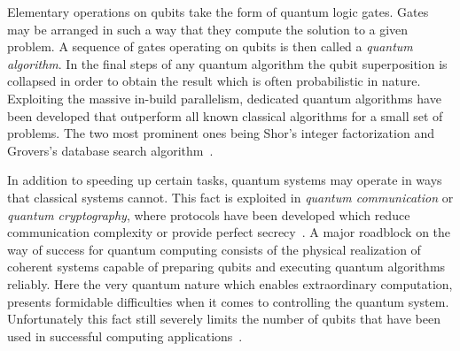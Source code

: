 		Elementary operations on qubits take the form of quantum logic gates. Gates may be arranged in such a way that they compute the solution to a given problem. A sequence of gates operating on qubits is then called a \emph{quantum algorithm}. In the final steps of any quantum algorithm the qubit superposition is collapsed in order to obtain the result which is often probabilistic in nature. Exploiting the massive in-build parallelism, dedicated quantum algorithms have been developed that outperform all known classical algorithms for a small set of problems. The two most prominent ones being Shor's integer factorization and Grovers's database search algorithm~\cite{shor1999polynomial,grover1996fast}. 

		In addition to speeding up certain tasks, quantum systems may operate in ways that classical systems cannot. This fact is exploited in \emph{quantum communication} or \emph{quantum cryptography}, where protocols have been developed which reduce communication complexity or provide perfect secrecy~\cite{de2007fundamentals}. A major roadblock on the way of success for quantum computing consists of the physical realization of coherent systems capable of preparing qubits and executing quantum algorithms reliably. Here the very quantum nature which enables extraordinary computation, presents formidable difficulties when it comes to controlling the quantum system. Unfortunately this fact still severely limits the number of qubits that have been used in successful computing applications~\cite{Nielsen:2011:QCQ:1972505}. 

		\FloatBarrier
